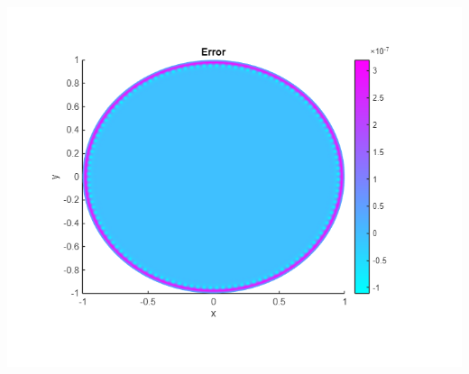\documentclass{scrartcl}
\begin{document}
\includegraphics[scale=0.7]{Poisson1aplot2error.png}\\
\end{document}

